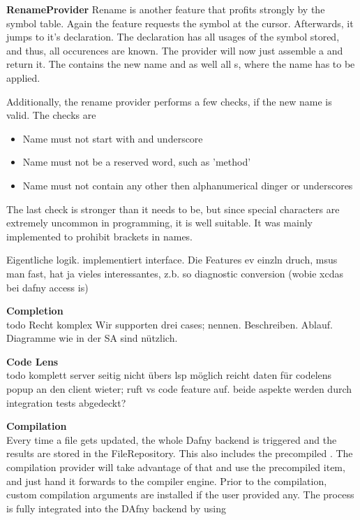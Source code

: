 \textbf{RenameProvider}
Rename is another feature that profits strongly by the symbol table. Again the feature requests the symbol at the cursor. Afterwards, it jumps to it's declaration. The declaration has all usages of the symbol stored, and thus, all occurences are known. The provider will now just assemble a  and return it. The  contains the new name and as well all s, where the name has to be applied.

Additionally, the rename provider performs a few checks, if the new name is valid. The checks are
\begin{itemize}
    \item Name must not start with and underscore
    \item Name must not be a reserved word, such as 'method'
    \item Name must not contain any other then alphanumerical dinger or underscores
\end{itemize}

The last check is stronger than it needs to be, but since special characters are extremely uncommon in programming, it is well suitable. It was mainly implemented to prohibit brackets in names.


Eigentliche logik. implementiert interface. Die Features ev einzln druch, msus man fast, hat ja vieles interessantes, z.b. so diagnostic conversion (wobie xcdas bei dafny access is)

\textbf{Completion}\\
todo
Recht komplex
Wir supporten drei cases; nennen. Beschreiben.
Ablauf. Diagramme wie in der SA sind nützlich.

\textbf{Code Lens}\\
todo
komplett server seitig nicht übers lsp möglich
reicht daten für codelens popup an den client wieter; ruft vs code feature auf.
beide aspekte werden durch integration tests abgedeckt?

\textbf{Compilation}\\
Every time a file gets updated, the whole Dafny backend is triggered and the results are stored in the FileRepository. This also includes the precompiled . The compilation provider will take advantage of that and use the precompiled item, and just hand it forwards to the compiler engine. Prior to the compilation, custom compilation arguments are installed if the user provided any. The process is fully integrated into the DAfny backend by using

